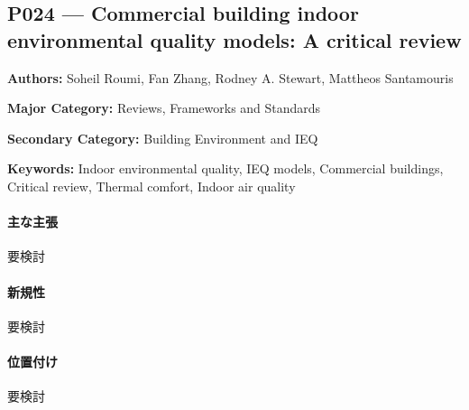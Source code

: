 \subsection{P024 --- Commercial building indoor environmental quality models: A critical review}
\label{paper:P024}
\textbf{Authors:} Soheil Roumi, Fan Zhang, Rodney A. Stewart, Mattheos Santamouris\par
\textbf{Major Category:} Reviews, Frameworks and Standards\par
\textbf{Secondary Category:} Building Environment and IEQ\par
\textbf{Keywords:} Indoor environmental quality, IEQ models, Commercial buildings, Critical review, Thermal comfort, Indoor air quality\par
\paragraph{主な主張}
要検討 \cite{Roumi:2022IEQModelsReview}
\paragraph{新規性}
要検討
\paragraph{位置付け}
要検討
